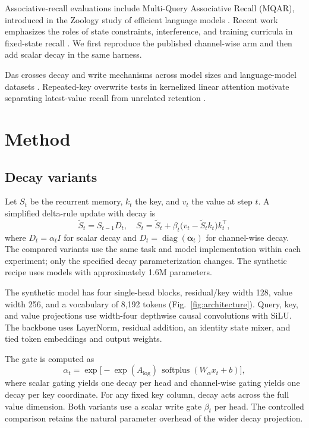 \documentclass[conference]{IEEEtran}
\begin{document}
Associative-recall evaluations include Multi-Query Associative Recall (MQAR), introduced in the Zoology study of efficient language models \cite{arora2024zoology}. Recent work emphasizes the roles of state constraints, interference, and training curricula in fixed-state recall \cite{boesch2026anatomy}. We first reproduce the published channel-wise arm and then add scalar decay in the same harness.

Das crosses decay and write mechanisms across model sizes and language-model datasets \cite{das2026}. Repeated-key overwrite tests in kernelized linear attention motivate separating latest-value recall from unrelated retention \cite{ghaleb2026kata}.

\section{Method}
\subsection{Decay variants}
Let $S_t$ be the recurrent memory, $k_t$ the key, and $v_t$ the value at step $t$. A simplified delta-rule update with decay is
\begin{equation}
 \widetilde S_t = S_{t-1}D_t,\quad
 S_t = \widetilde S_t + \beta_t\bigl(v_t-\widetilde S_t k_t\bigr)k_t^{\top},
\end{equation}
where $D_t=\alpha_t I$ for scalar decay and $D_t=\operatorname{diag}(\boldsymbol{\alpha}_t)$ for channel-wise decay. The compared variants use the same task and model implementation within each experiment; only the specified decay parameterization changes. The synthetic recipe uses models with approximately 1.6M parameters.

The synthetic model has four single-head blocks, residual/key width 128, value width 256, and a vocabulary of 8,192 tokens (Fig.~\ref{fig:architecture}). Query, key, and value projections use width-four depthwise causal convolutions with SiLU. The backbone uses LayerNorm, residual addition, an identity state mixer, and tied token embeddings and output weights.

The gate is computed as
\begin{equation}
 \alpha_t = \exp\!\big[-\exp(A_{\log})\,
  \operatorname{softplus}(W_{\alpha}x_t+b)\big],
\end{equation}
where scalar gating yields one decay per head and channel-wise gating yields one decay per key coordinate. For any fixed key column, decay acts across the full value dimension. Both variants use a scalar write gate $\beta_t$ per head. The controlled comparison retains the natural parameter overhead of the wider decay projection.
\end{document}
